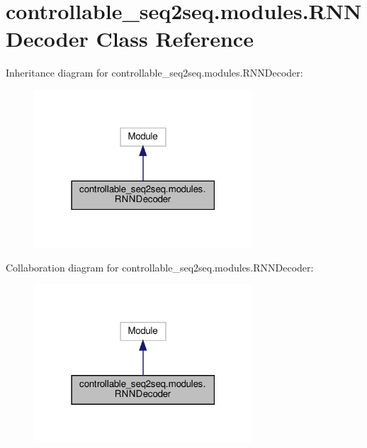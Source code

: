 \hypertarget{classcontrollable__seq2seq_1_1modules_1_1RNNDecoder}{}\section{controllable\+\_\+seq2seq.\+modules.\+R\+N\+N\+Decoder Class Reference}
\label{classcontrollable__seq2seq_1_1modules_1_1RNNDecoder}


Inheritance diagram for controllable\+\_\+seq2seq.\+modules.\+R\+N\+N\+Decoder\+:
\nopagebreak
\begin{figure}[H]
\begin{center}
\leavevmode
\includegraphics[width=231pt]{classcontrollable__seq2seq_1_1modules_1_1RNNDecoder__inherit__graph}
\end{center}
\end{figure}


Collaboration diagram for controllable\+\_\+seq2seq.\+modules.\+R\+N\+N\+Decoder\+:
\nopagebreak
\begin{figure}[H]
\begin{center}
\leavevmode
\includegraphics[width=231pt]{classcontrollable__seq2seq_1_1modules_1_1RNNDecoder__coll__graph}
\end{center}
\end{figure}
